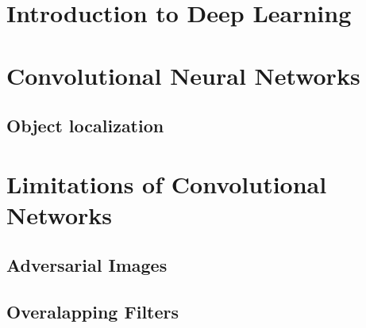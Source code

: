 \section{Introduction to Deep Learning}

\section{Convolutional Neural Networks}

\subsection{Object localization}


\section{Limitations of Convolutional Networks}

\subsection{Adversarial Images}

\subsection{Overalapping Filters}


